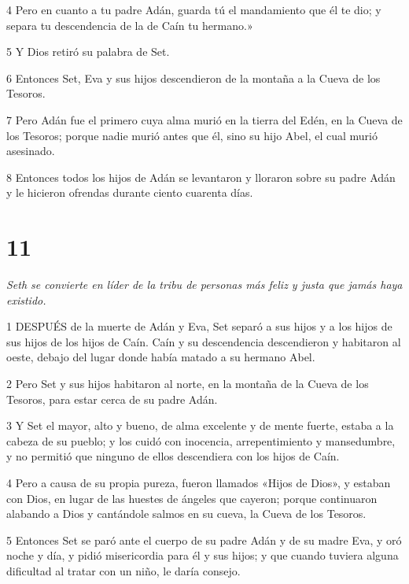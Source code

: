 \par 4 Pero en cuanto a tu padre Adán, guarda tú el mandamiento que él te dio; y separa tu descendencia de la de Caín tu hermano.»

\par 5 Y Dios retiró su palabra de Set.

\par 6 Entonces Set, Eva y sus hijos descendieron de la montaña a la Cueva de los Tesoros.

\par 7 Pero Adán fue el primero cuya alma murió en la tierra del Edén, en la Cueva de los Tesoros; porque nadie murió antes que él, sino su hijo Abel, el cual murió asesinado.

\par 8 Entonces todos los hijos de Adán se levantaron y lloraron sobre su padre Adán y le hicieron ofrendas durante ciento cuarenta días.

\chapter{11}

\par \textit{Seth se convierte en líder de la tribu de personas más feliz y justa que jamás haya existido.}

\par 1 DESPUÉS de la muerte de Adán y Eva, Set separó a sus hijos y a los hijos de sus hijos de los hijos de Caín. Caín y su descendencia descendieron y habitaron al oeste, debajo del lugar donde había matado a su hermano Abel.

\par 2 Pero Set y sus hijos habitaron al norte, en la montaña de la Cueva de los Tesoros, para estar cerca de su padre Adán.

\par 3 Y Set el mayor, alto y bueno, de alma excelente y de mente fuerte, estaba a la cabeza de su pueblo; y los cuidó con inocencia, arrepentimiento y mansedumbre, y no permitió que ninguno de ellos descendiera con los hijos de Caín.

\par 4 Pero a causa de su propia pureza, fueron llamados «Hijos de Dios», y estaban con Dios, en lugar de las huestes de ángeles que cayeron; porque continuaron alabando a Dios y cantándole salmos en su cueva, la Cueva de los Tesoros.

\par 5 Entonces Set se paró ante el cuerpo de su padre Adán y de su madre Eva, y oró noche y día, y pidió misericordia para él y sus hijos; y que cuando tuviera alguna dificultad al tratar con un niño, le daría consejo.

